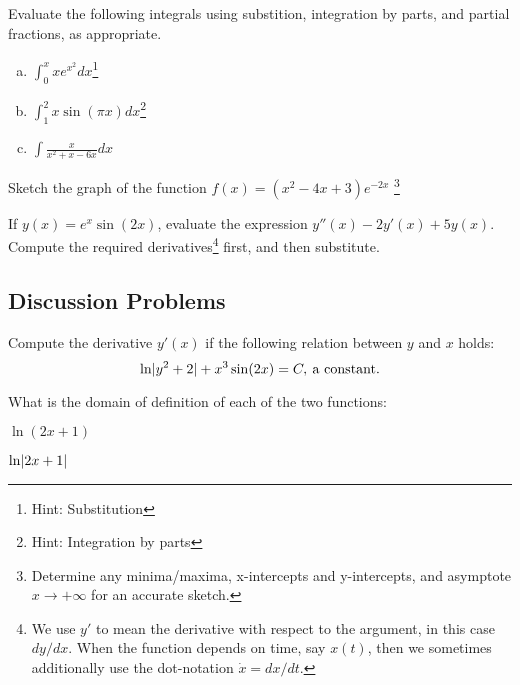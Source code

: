   \begin{question}
    Evaluate the following integrals using substition, integration by parts, and partial fractions, as appropriate.
    \begin{enumerate}[(a)]
    \item \(\int_{0}^{x} x e^{x^{2}}dx\)\footnote{Hint: Substitution} \solspace{0.5in}
    \item \(\int_{1}^{2} x \sin(\pi x)dx\)\footnote{Hint: Integration by parts}  \solspace{0.5in}
    \item \(\int \frac{x}{x^{2}+x-6x}dx\)  \solspace{0.5in}
    \end{enumerate}
  \end{question}

\begin{question}
  Sketch the graph of the function \(f(x) = (x^{2} -4x + 3)e^{-2x}\) \footnote{Determine any minima/maxima, x-intercepts and y-intercepts, and asymptote \(x\to+\infty\) for an accurate sketch.}

    \end{question}

\begin{question}
    If \(y(x) = e^{x}\sin(2x)\), evaluate the expression
    \( y''(x) -2 y'(x) + 5 y(x)\).
    Compute the required derivatives\footnote{We use \(y'\) to mean the derivative with respect to the argument, in this case \(dy/dx\). When the function depends on time, say \(x(t)\), then we sometimes additionally use the dot-notation \(\dot{x}=dx/dt\).} first, and then substitute.
    \solspace{1in}
\end{question}


\subsection*{Discussion Problems}
\begin{question}
    Compute the derivative \(y'(x)\) if the following relation between \(y\) and \(x\) holds:
    \[
      \ln\lvert y^{2} + 2\rvert + x^{3}\sin(2x) = C,\: \text{a constant.}
    \]
\end{question}

\begin{question}
    What is the domain of definition of each of the two functions:
    \begin{colenumerate}
      \item \(\ln(2x+1)\)  \item \(\ln\lvert2x+1\rvert\)
    \end{colenumerate}
\end{question}

